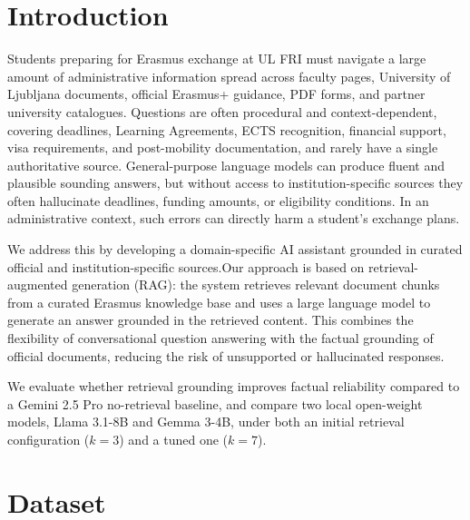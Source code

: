 \documentclass[fleqn,moreauthors,10pt]{ds_report}
\affiliation{\textit{Advisors: Aleš Žagar}}
\begin{document}
\flushbottom
\maketitle
\thispagestyle{empty}

\section*{Introduction}

Students preparing for Erasmus exchange at UL FRI must navigate a
large amount of administrative information spread across faculty pages,
University of Ljubljana documents, official Erasmus+ guidance, PDF
forms, and partner university catalogues. Questions are often
procedural and context-dependent, covering deadlines, Learning
Agreements, ECTS recognition, financial support, visa requirements, and
post-mobility documentation, and rarely have a single authoritative
source. General-purpose language models can produce fluent and plausible sounding
answers, but without access to institution-specific sources they often
hallucinate deadlines, funding amounts, or eligibility conditions. In an
administrative context, such errors can directly harm a student's exchange
plans.

We address this by developing a domain-specific AI assistant grounded
in curated official and institution-specific sources.Our approach is based on retrieval-augmented generation (RAG): the
system retrieves relevant document chunks from a curated Erasmus
knowledge base and uses a large language model to generate an answer
grounded in the retrieved content. This combines the flexibility of conversational question
answering with the factual grounding of official documents, reducing
the risk of unsupported or hallucinated responses.

We evaluate whether retrieval grounding improves factual reliability
compared to a Gemini 2.5 Pro no-retrieval baseline, and compare two local
open-weight models, Llama 3.1-8B and Gemma 3-4B, under both an
initial retrieval configuration ($k{=}3$) and a tuned one ($k{=}7$).

\section*{Dataset}
\end{document}
